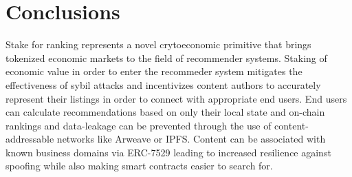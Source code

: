 \section{Conclusions}

Stake for ranking represents a novel crytoeconomic primitive that brings tokenized economic markets to the field of recommender systems. Staking of economic value in order to enter the recommeder system mitigates the effectiveness of sybil attacks and incentivizes content authors to accurately represent their listings in order to connect with appropriate end users. End users can calculate recommendations based on only their local state and on-chain rankings and data-leakage can be prevented through the use of content-addressable networks like Arweave or IPFS. Content can be associated with known business domains via ERC-7529 leading to increased resilience against spoofing while also making smart contracts easier to search for.  